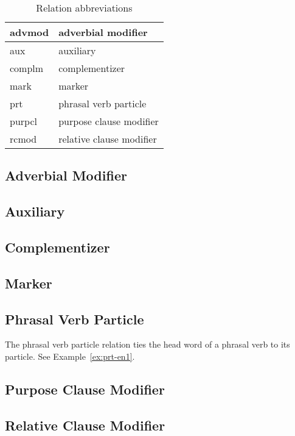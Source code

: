 \documentclass[main.tex]{subfiles}
\begin{document}
\begin{table}
\caption{Relation abbreviations}
\begin{center}
  \begin{tabular}{| l | l |}
    \hline
    advmod & adverbial modifier  \\
    \hline
    aux & auxiliary \\
    \hline
    complm & complementizer \\
    \hline
    mark & marker \\
    \hline
    prt & phrasal verb particle \\
    \hline
    purpcl & purpose clause modifier \\
    \hline
    rcmod & relative clause modifier \\
    \hline
  \end{tabular}
\end{center}
\label{table:reln-abbr}
\end{table}

\subsection{Adverbial Modifier}
\subsection{Auxiliary}
\subsection{Complementizer}
\subsection{Marker}
\subsection{Phrasal Verb Particle}

The phrasal verb particle relation ties the head word of a phrasal verb to its particle. 
See Example~\ref{ex:prt-en1}.
\subsection{Purpose Clause Modifier}
\subsection{Relative Clause Modifier}

\def\biblio{}
\end{document}
